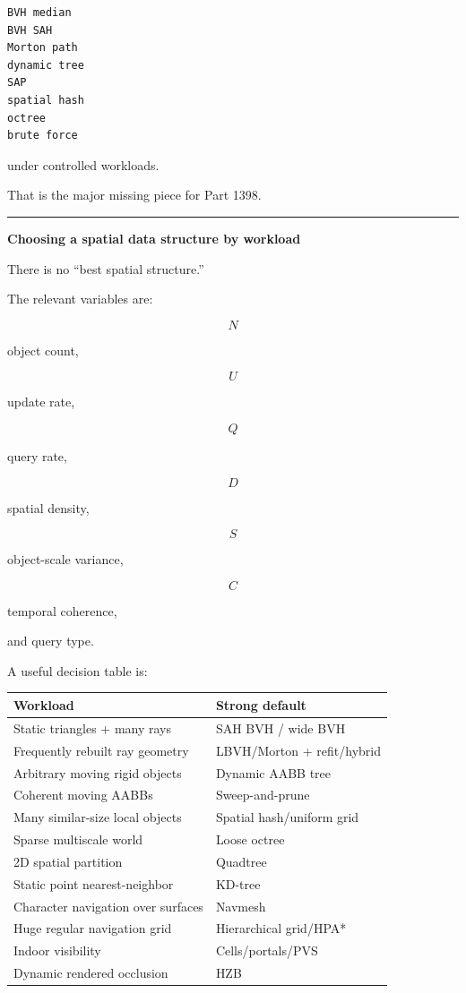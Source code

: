 \begin{verbatim}
BVH median
BVH SAH
Morton path
dynamic tree
SAP
spatial hash
octree
brute force
\end{verbatim}

under controlled workloads.

That is the major missing piece for Part 1398.

\begin{center}\rule{0.5\linewidth}{0.5pt}\end{center}

\textbf{Choosing a spatial data structure by workload}

There is no ``best spatial structure.''

The relevant variables are:

\[
N
\]

object count,

\[
U
\]

update rate,

\[
Q
\]

query rate,

\[
D
\]

spatial density,

\[
S
\]

object-scale variance,

\[
C
\]

temporal coherence,

and query type.

A useful decision table is:

{\def\LTcaptype{none} %
\begin{longtable}[]{@{}ll@{}}
\toprule\noalign{}
Workload & Strong default \\
\midrule\noalign{}
\endhead
\bottomrule\noalign{}
\endlastfoot
Static triangles + many rays & SAH BVH / wide BVH \\
Frequently rebuilt ray geometry & LBVH/Morton + refit/hybrid \\
Arbitrary moving rigid objects & Dynamic AABB tree \\
Coherent moving AABBs & Sweep-and-prune \\
Many similar-size local objects & Spatial hash/uniform grid \\
Sparse multiscale world & Loose octree \\
2D spatial partition & Quadtree \\
Static point nearest-neighbor & KD-tree \\
Character navigation over surfaces & Navmesh \\
Huge regular navigation grid & Hierarchical grid/HPA* \\
Indoor visibility & Cells/portals/PVS \\
Dynamic rendered occlusion & HZB \\
\end{longtable}
}


